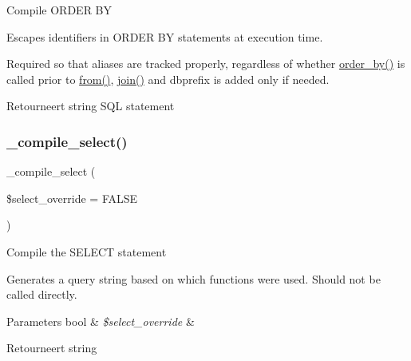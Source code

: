 Compile O\+R\+D\+ER BY

Escapes identifiers in O\+R\+D\+ER BY statements at execution time.

Required so that aliases are tracked properly, regardless of whether \mbox{\hyperlink{class_c_i___d_b__query__builder_a6d1ce6a3b22187165ce7d710ce91841d}{order\+\_\+by()}} is called prior to \mbox{\hyperlink{class_c_i___d_b__query__builder_a91f5f004ed8e2237a4decc5d23ac3457}{from()}}, \mbox{\hyperlink{class_c_i___d_b__query__builder_a54557b1ef757507cbbd2a8802a99810b}{join()}} and dbprefix is added only if needed.

\begin{DoxyReturn}{Retourneert}
string S\+QL statement 
\end{DoxyReturn}
\mbox{\label{class_c_i___d_b__query__builder_a441f6e994a212cfa12dd33d92973915b}} 
\subsubsection{\texorpdfstring{\_compile\_select()}{\_compile\_select()}}
{\footnotesize\ttfamily \+\_\+compile\+\_\+select (\begin{DoxyParamCaption}\item[{}]{\$select\+\_\+override = {\ttfamily FALSE} }\end{DoxyParamCaption})\hspace{0.3cm}{\ttfamily [protected]}}

Compile the S\+E\+L\+E\+CT statement

Generates a query string based on which functions were used. Should not be called directly.


\begin{DoxyParams}[1]{Parameters}
bool & {\em \$select\+\_\+override} & \\
\hline
\end{DoxyParams}
\begin{DoxyReturn}{Retourneert}
string 
\end{DoxyReturn}
\mbox{\label{class_c_i___d_b__query__builder_a3d2301b84734fd18a0db6d0602106f48}} 
